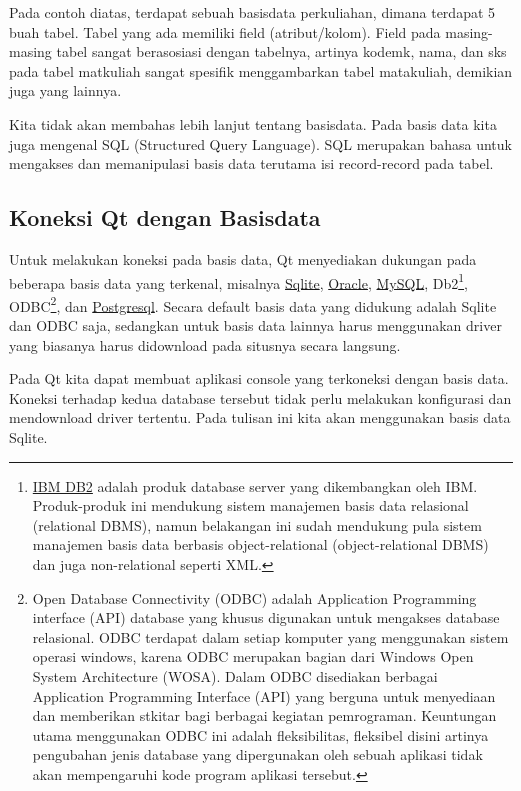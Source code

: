 Pada contoh diatas, terdapat sebuah basisdata perkuliahan, dimana
terdapat 5 buah tabel. Tabel yang ada memiliki field (atribut/kolom).
Field pada masing-masing tabel sangat berasosiasi dengan tabelnya,
artinya kodemk, nama, dan sks pada tabel matkuliah sangat spesifik
menggambarkan tabel matakuliah, demikian juga yang lainnya.

Kita tidak akan membahas lebih lanjut tentang basisdata. Pada basis data
kita juga mengenal SQL (Structured Query Language). SQL merupakan bahasa
untuk mengakses dan memanipulasi basis data terutama isi record-record
pada tabel.

\subsection{Koneksi Qt dengan Basisdata}\label{koneksi-qt-dengan-basisdata}

Untuk melakukan koneksi pada basis data, Qt menyediakan dukungan pada
beberapa basis data yang terkenal, misalnya
\href{https://www.sqlite.org/about.html}{Sqlite},
\href{https://en.wikipedia.org/wiki/Oracle_Database}{Oracle},
\href{https://www.mysql.com/about/}{MySQL}, Db2\footnote{\href{https://en.wikipedia.org/wiki/IBM_DB2}{IBM
DB2} adalah produk database server yang dikembangkan oleh IBM.
Produk-produk ini mendukung sistem manajemen basis data relasional
(relational DBMS), namun belakangan ini sudah mendukung pula sistem
manajemen basis data berbasis object-relational (object-relational
DBMS) dan juga non-relational seperti XML.}, ODBC\footnote{Open
Database Connectivity (ODBC) adalah Application Programming interface
(API) database yang khusus digunakan untuk mengakses database
relasional. ODBC terdapat dalam setiap komputer yang menggunakan
sistem operasi windows, karena ODBC merupakan bagian dari Windows Open
System Architecture (WOSA). Dalam ODBC disediakan berbagai Application
Programming Interface (API) yang berguna untuk menyediaan dan
memberikan stkitar bagi berbagai kegiatan pemrograman. Keuntungan
utama menggunakan ODBC ini adalah fleksibilitas, fleksibel disini
artinya pengubahan jenis database yang dipergunakan oleh sebuah
aplikasi tidak akan mempengaruhi kode program aplikasi tersebut.}, dan
\href{https://id.wikipedia.org/wiki/PostgreSQL}{Postgresql}. Secara
default basis data yang didukung adalah Sqlite dan ODBC saja, sedangkan
untuk basis data lainnya harus menggunakan driver yang biasanya harus
didownload pada situsnya secara langsung.

Pada Qt kita dapat membuat aplikasi console yang terkoneksi dengan basis
data. Koneksi terhadap kedua database tersebut tidak perlu melakukan
konfigurasi dan mendownload driver tertentu. Pada tulisan ini kita akan
menggunakan basis data Sqlite.

